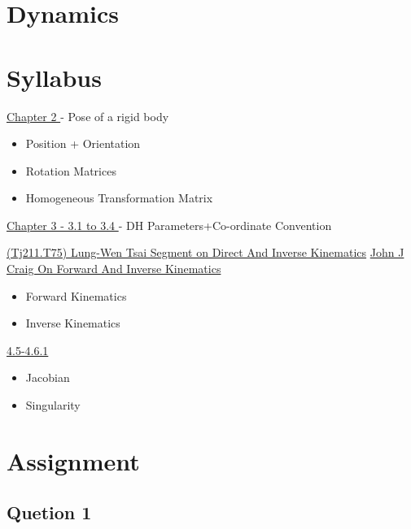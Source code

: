 \documentclass[11pt]{report}
\begin{document}
\part{Dynamics}
\label{sec:org81a6a4c}
\part{Syllabus}
\label{sec:org7388c6a}
\href{file:///home/adithya/university-notes/Introduction To Robotics/textbooks/Introduction-to-Robotics-Craig.pdf}{Chapter 2
}- Pose of a rigid body
\begin{itemize}
\item Position + Orientation
\end{itemize}
\begin{itemize}
\item Rotation Matrices
\item Homogeneous Transformation Matrix
\end{itemize}

\href{file:///home/adithya/university-notes/Introduction To Robotics/textbooks/Introduction-to-Robotics-Craig.pdf}{Chapter 3 - 3.1 to 3.4
}- DH Parameters+Co-ordinate Convention

\href{file:///home/adithya/university-notes/Introduction To Robotics/textbooks/(Tj211.T75) Lung-Wen Tsai - Robot Analysis_ The mechanics of serial and parallel manipulators (1999).pdf}{(Tj211.T75) Lung-Wen Tsai Segment on Direct And Inverse Kinematics}
\href{file:///home/adithya/university-notes/Introduction To Robotics/textbooks/Introduction-to-Robotics-Craig.pdf}{John J Craig On Forward And Inverse Kinematics}
\begin{itemize}
\item Forward Kinematics
\item Inverse Kinematics
\end{itemize}

\href{file:///home/adithya/university-notes/Introduction To Robotics/textbooks/(Tj211.T75) Lung-Wen Tsai - Robot Analysis_ The mechanics of serial and parallel manipulators (1999).pdf}{4.5-4.6.1}
\begin{itemize}
\item Jacobian
\item Singularity
\end{itemize}
\part{Assignment}
\label{sec:org117816d}
\chapter{Quetion 1}
\label{sec:org6033d27}
\end{document}
